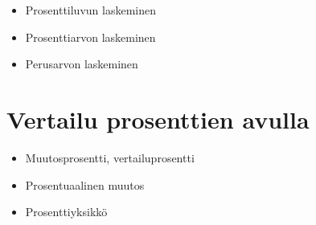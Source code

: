 \begin{itemize}
	\item Prosenttiluvun laskeminen
	\item Prosenttiarvon laskeminen
	\item Perusarvon laskeminen
\end{itemize}

\section{Vertailu prosenttien avulla}

\begin{itemize}
	\item Muutosprosentti, vertailuprosentti
	\item Prosentuaalinen muutos
	\item Prosenttiyksikkö
\end{itemize}
